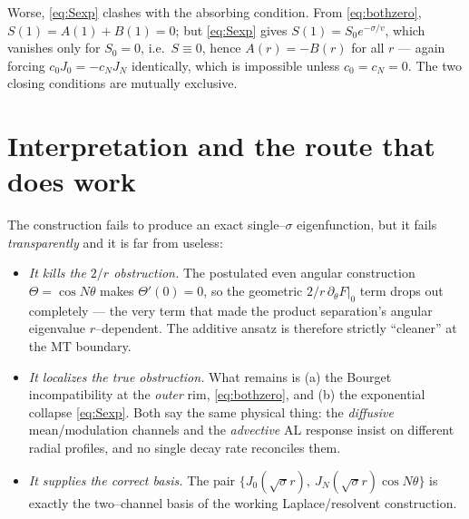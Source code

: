 \documentclass{article}
\begin{document}
Worse, \eqref{eq:Sexp} clashes with the absorbing condition. From
\eqref{eq:bothzero}, $S(1)=A(1)+B(1)=0$; but \eqref{eq:Sexp} gives
$S(1)=S_0e^{-\sigma/v}$, which vanishes only for $S_0=0$, i.e.\ $S\equiv0$, hence
$A(r)=-B(r)$ for all $r$ --- again forcing $c_0J_0=-c_NJ_N$ identically, which is
impossible unless $c_0=c_N=0$. The two closing conditions are mutually exclusive.

\section{Interpretation and the route that does work}

The construction fails to produce an exact single--$\sigma$ eigenfunction, but it
fails \emph{transparently} and it is far from useless:
\begin{itemize}
\item \emph{It kills the $2/r$ obstruction.} The postulated even angular
construction $\Theta=\cos N\theta$ makes $\Theta'(0)=0$, so the geometric
$2/r\,\partial_\theta F|_0$ term drops out completely --- the very term that made
the product separation's angular eigenvalue $r$--dependent. The additive ansatz
is therefore strictly ``cleaner'' at the MT boundary.
\item \emph{It localizes the true obstruction.} What remains is (a) the Bourget
incompatibility at the \emph{outer} rim, \eqref{eq:bothzero}, and (b) the
exponential collapse \eqref{eq:Sexp}. Both say the same physical thing: the
\emph{diffusive} mean/modulation channels and the \emph{advective} AL response
insist on different radial profiles, and no single decay rate reconciles them.
\item \emph{It supplies the correct basis.} The pair
$\{J_0(\sqrt\sigma r),\ J_N(\sqrt\sigma r)\cos N\theta\}$ is exactly the
two--channel basis of the working Laplace/resolvent construction.
\end{itemize}
\end{document}
